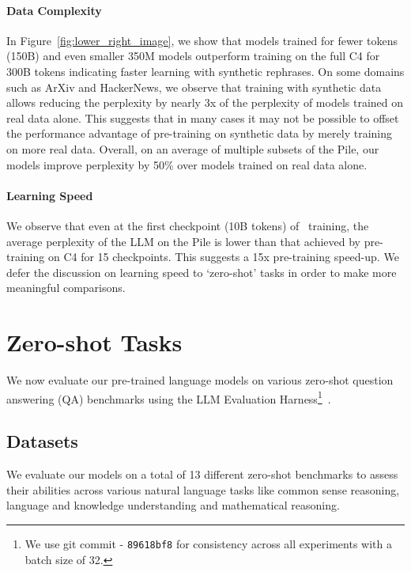 \paragraph{Data Complexity}
In Figure~\ref{fig:lower_right_image}, we show that models trained for fewer tokens (150B) and even smaller 350M models outperform training on the full C4 for 300B tokens indicating faster learning with synthetic rephrases.  
On some domains such as ArXiv and HackerNews, we observe that training with synthetic data allows reducing the perplexity by nearly 3x of the perplexity of models trained on real data alone. This suggests that in many cases 
it may not be possible to offset 
the performance advantage of pre-training on synthetic data
by merely training on more real data.
Overall, on an average of multiple subsets of the Pile,
our models improve perplexity by 50\% over models trained on real data alone. 

\paragraph{Learning Speed}
We observe that even at the first checkpoint (10B tokens) of \ours~training, the average perplexity of the LLM on the Pile is lower than that achieved by pre-training on C4 for 15 checkpoints. This suggests a 15x pre-training speed-up. We defer the discussion on learning speed to  `zero-shot' tasks in order to make more meaningful comparisons. 






\section{Zero-shot Tasks}
We now evaluate our pre-trained language models on various zero-shot question answering (QA) benchmarks
using the LLM Evaluation Harness\footnote{We use git commit - \texttt{89618bf8} for consistency across all experiments with a batch size of 32.}~\citep{eval-harness}.

\subsection{Datasets}
We evaluate our models on a total of 13 different zero-shot benchmarks to assess their abilities across various natural language tasks like common sense reasoning, language and knowledge understanding and mathematical reasoning.

